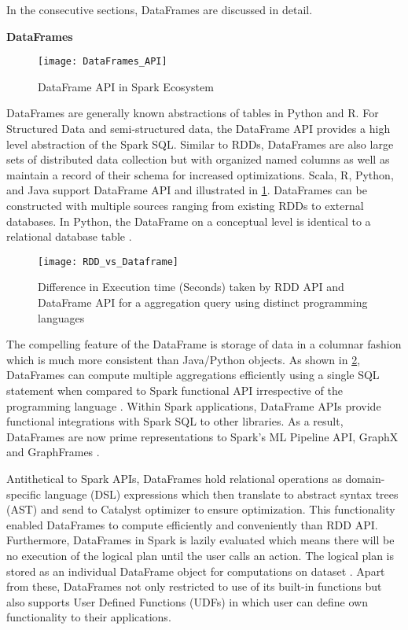 \par In the consecutive sections, DataFrames are discussed in detail.

\textbf{DataFrames}

\begin{figure}[htbp]
	\centering
		\texttt{[image: DataFrames\_API]}
	\caption{DataFrame API in Spark Ecosystem }
	\label{fig: DataFrame API}
\end{figure}

\par DataFrames are generally known abstractions of tables in Python and R. For Structured Data and semi-structured data, the DataFrame API provides a high level abstraction of the Spark SQL. Similar to RDDs, DataFrames are also large sets of distributed data collection but with organized named columns as well as maintain a record of their schema for increased optimizations. Scala, R, Python, and Java support DataFrame API and illustrated in \ref{fig: DataFrame API}. DataFrames can be constructed with multiple sources ranging from existing RDDs to external databases. In Python, the DataFrame on a conceptual level is identical to a relational database table \cite{spark:website}.


\begin{figure}[htbp]
	\centering
		\texttt{[image: RDD\_vs\_Dataframe]}
	\caption{Difference in Execution time (Seconds) taken by RDD API and DataFrame API for a aggregation query using distinct programming languages \cite{armbrust2015scaling} }
	\label{fig: RDDvsDataFrame}
\end{figure}

\par The compelling feature of the DataFrame is storage of data in a columnar fashion which is much more consistent than Java/Python objects. As shown in \ref{fig: RDDvsDataFrame}, DataFrames can compute multiple aggregations efficiently using a single SQL statement when compared to Spark functional API irrespective of the programming language \cite{armbrust2015spark}. Within Spark applications, DataFrame APIs provide functional integrations with Spark SQL to other libraries. As a result, DataFrames are now prime representations to Spark's ML Pipeline API, GraphX and GraphFrames \cite{karau2015learning}.

\par Antithetical to Spark APIs, DataFrames hold relational operations as domain-specific language (DSL) expressions which then translate to abstract syntax trees (AST) and send to Catalyst optimizer to ensure optimization. This functionality enabled DataFrames to compute efficiently and conveniently than RDD API. Furthermore,  DataFrames in Spark is lazily evaluated which means there will be no execution of the logical plan until the user calls an action. The logical plan is stored as an individual DataFrame object for computations on dataset \cite{armbrust2015spark}. Apart from these, DataFrames not only restricted to use of its built-in functions but also supports User Defined Functions (UDFs) in which user can define own functionality to their applications.

